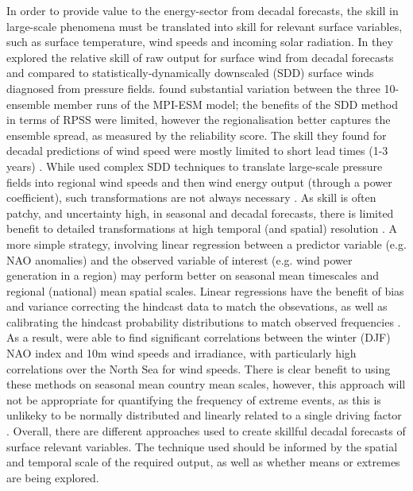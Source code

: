 \documentclass{article}
\begin{document}
In order to provide value to the energy-sector from decadal forecasts, the skill in large-scale phenomena must be translated into skill for relevant surface variables, such as surface temperature, wind speeds and incoming solar radiation. In \cite{moemken2016decadal} they explored the relative skill of raw output for surface wind from decadal forecasts and compared to statistically-dynamically downscaled (SDD) surface winds diagnosed from pressure fields. \cite{moemken2016decadal} found substantial variation between the three 10-ensemble member runs of the MPI-ESM model; the benefits of the SDD method in terms of RPSS were limited, however the regionalisation better captures the ensemble spread, as measured by the reliability score. The skill they found for decadal predictions of wind speed were mostly limited to short lead times (1-3 years) \parencite{moemken2016decadal}. While \cite{moemken2016decadal} used complex SDD techniques to translate large-scale pressure fields into regional wind speeds and then wind energy output (through a power coefficient), such transformations are not always necessary \parencite{bett2022simplified}. As skill is often patchy, and uncertainty high, in seasonal and decadal forecasts, there is limited benefit to detailed transformations at high temporal (and spatial) resolution \parencite{bett2022simplified}. A more simple strategy, involving linear regression between a predictor variable (e.g. NAO anomalies)
and the observed variable of interest (e.g. wind power generation in a region) may perform better on seasonal mean timescales and regional (national) mean spatial scales. Linear regressions have the benefit of bias and variance correcting the hindcast data to match the obsevations, as well as calibrating the hindcast probability distributions to match observed frequencies \parencite{bett2022simplified,wilks_statistical_2019}.
As a result, \cite{bett2022simplified} were able to find significant correlations between the winter (DJF) NAO index and 10m wind speeds and irradiance, with particularly high correlations over the North Sea for wind speeds. There is clear benefit to  using these methods on seasonal mean country mean scales, however, this approach will not be appropriate for quantifying the frequency of extreme events, as this is unlikeky to be normally distributed and linearly related to a single driving factor \parencite{bett2022simplified,thornton2019skilful}. Overall, there are different approaches used to create skillful decadal forecasts of surface relevant variables. The technique used should be informed by the spatial and temporal scale of the required output, as well as whether means or extremes are being explored.
\end{document}
